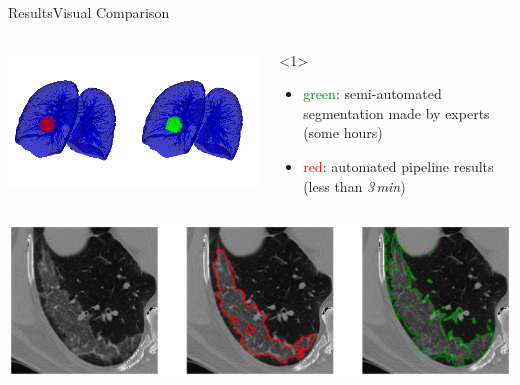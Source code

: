 \documentclass{standalone}
\begin{document}
	\begin{frame}{Results}{Visual Comparison}


		\begin{columns}
			\begin{column}{.5\textwidth}
				\centering\includegraphics[width=\linewidth]{./img/3Dlesion}
			\end{column}
			\begin{column}{.4\textwidth}
				\begin{block}{}<1>
					\begin{itemize}
						\item \textcolor{green}{green}: semi-automated segmentation made by experts (some hours)
						\item \textcolor{red}{red}: automated pipeline results (less than \textit{3\,min})
					\end{itemize}
				\end{block}
			
			\end{column}
		\end{columns}
		\centering\includegraphics[width=\linewidth]{./img/zoom}
		\vspace{2mm}
	\end{frame}
\end{document}
